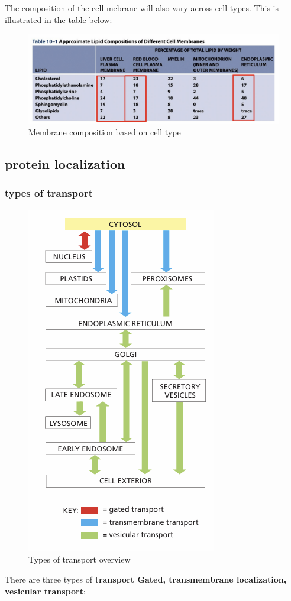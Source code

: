 \documentclass[../main.tex]{subfiles}
\begin{document}
The composition of the cell mebrane will also vary across cell types. This is illustrated in the table below:
\begin{figure}[H]
    \centering
    \includegraphics[width=\linewidth]{Mebranecomposition.png}
    \caption{Membrane composition based on cell type}
    \label{fig:enter-label}
\end{figure}


\subsection{protein localization}
\subsubsection{types of transport}


\begin{figure}[H]
    \centering
    \includegraphics[width=0.3\linewidth]{typesOfTransport.png}
    \caption{Types of transport overview}
    \label{fig:enter-label}
\end{figure}
There are three types of \textbf{transport Gated, transmembrane localization, vesicular transport}:
\end{document}
